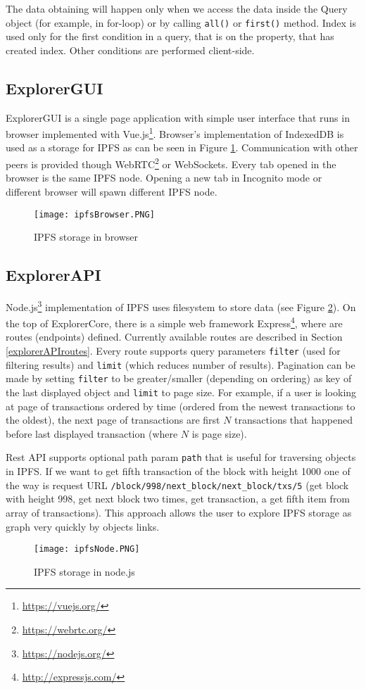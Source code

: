 The data obtaining will happen only when we access the data inside the Query object (for example, in for-loop) or by calling \texttt{all()} or \texttt{first()} method. Index is used only for the first condition in a query, that is on the property, that has created index. Other conditions are performed client-side.

\subsection{ExplorerGUI}
ExplorerGUI is a single page application with simple user interface that runs in browser implemented with Vue.js\footnote{\url{https://vuejs.org/}}. Browser's implementation of IndexedDB is used as a storage for IPFS as can be seen in Figure \ref{browserIPFS}. Communication with other peers is provided though WebRTC\footnote{\url{https://webrtc.org/}} or WebSockets. Every tab opened in the browser is the same IPFS node. Opening a new tab in Incognito mode or different browser will spawn different IPFS node.

\begin{figure}[h]
    \centering
    \texttt{[image: ipfsBrowser.PNG]}
    \caption{IPFS storage in browser}
    \label{browserIPFS}
\end{figure}


\subsection{ExplorerAPI}
Node.js\footnote{\url{https://nodejs.org/}} implementation of IPFS uses filesystem to store data (see Figure \ref{nodeIPFS}). On the top of ExplorerCore, there is a simple web framework Express\footnote{\url{http://expressjs.com/}}, where are routes (endpoints) defined. Currently available routes are described in Section \ref{explorerAPIroutes}. Every route supports query parameters \texttt{filter} (used for filtering results) and \texttt{limit} (which reduces number of results). Pagination can be made by setting \texttt{filter} to be greater/smaller (depending on ordering) as key of the last displayed object and \texttt{limit} to page size. For example, if a user is looking at page of transactions ordered by time (ordered from the newest transactions to the oldest), the next page of transactions are first \(N\) transactions that happened before last displayed transaction (where \(N\) is page size).

Rest API supports optional path param \texttt{path} that is useful for traversing objects in IPFS. If we want to get fifth transaction of the block with height 1000 one of the way is request URL \texttt{/block/998/next\_block/next\_block/txs/5} (get block with height 998, get next block two times, get transaction, a get fifth item from array of transactions). This approach allows the user to explore IPFS storage as graph very quickly by objects links.

\begin{figure}[h]
    \centering
    \texttt{[image: ipfsNode.PNG]}
    \caption{IPFS storage in node.js}
    \label{nodeIPFS}
\end{figure}
